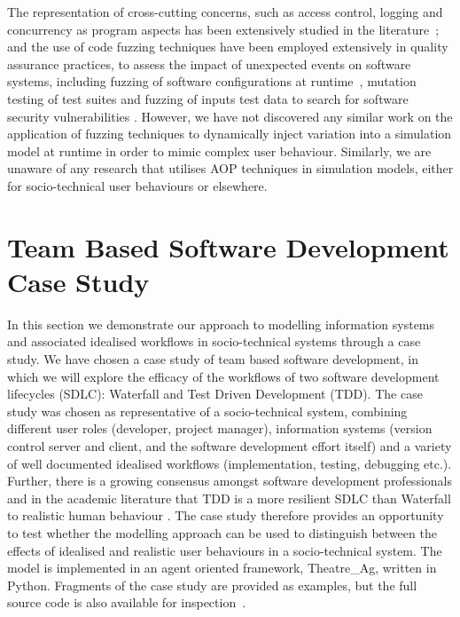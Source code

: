 \documentclass{llncs}
\begin{document}
The representation of cross-cutting concerns, such as access control, logging and concurrency as program aspects has
been extensively studied in the literature~\citep{Ali2012Aspect}; and the use of code fuzzing techniques have been
employed extensively in quality assurance practices, to assess the impact of unexpected events on software systems,
including fuzzing of software configurations at runtime~\citep{config_fuzzing}, mutation testing of test suites
\cite{demillo78hints} and fuzzing of inputs test data to search for software security vulnerabilities
\citep{takanen08fuzzing}.  However, we have not discovered any similar work on the application of fuzzing techniques to
dynamically inject variation into a simulation model at runtime in order to mimic complex user behaviour. Similarly, we
are unaware of any research that utilises AOP techniques in simulation models, either for socio-technical user
behaviours or elsewhere.


\section{Team Based Software Development Case Study}
\label{sec:case-study}


In this section we demonstrate our approach to modelling information systems and associated idealised workflows in
socio-technical systems through a case study.  We have chosen a case study of team based software development, in which
we will explore the efficacy of the workflows of two software development lifecycles (SDLC): Waterfall and Test Driven
Development (TDD).  The case study was chosen as representative of a socio-technical system, combining different user
roles (developer, project manager), information systems (version control server and client, and the software development
effort itself) and a variety of well documented idealised workflows (implementation, testing, debugging etc.).  Further,
there is a growing consensus amongst software development professionals and in the academic literature that TDD is a
more resilient SDLC than Waterfall to realistic human behaviour
\citep{Bhat2006TestDrivenDevelopment,George2004TestDrivenDevelopment,Huang2009EmpiricalTestFirstProgramming}.  The case
study therefore provides an opportunity to test whether the modelling approach can be used to distinguish between the
effects of idealised and realistic user behaviours in a socio-technical system.  The model is implemented in an agent
oriented framework, Theatre\_Ag, written in Python.  Fragments of the case study are provided as examples, but the full
source code is also available for inspection~\cite{storer2016softdev-workflow-scm}.
\end{document}

